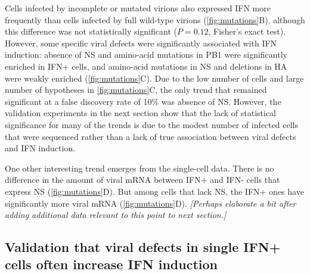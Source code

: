 \documentclass[10pt,letterpaper]{article}
\newcommand{\FIG}[1]{\autoref{fig:#1}}
\newcommand{\jdbcomment}[1]{\emph{\color{red} [#1]}}
\begin{document}
Cells infected by incomplete or mutated virions also expressed IFN more frequently than cells infected by full wild-type virions (\FIG{mutations}B), although this difference was not statistically significant ($P = 0.12$, Fisher's exact test).
However, some specific viral defects were significantly associated with IFN induction: absence of NS and amino-acid mutations in PB1 were significantly enriched in IFN+ cells, and amino-acid mutations in NS and deletions in HA were weakly enriched (\FIG{mutations}C).
Due to the low number of cells and large number of hypotheses in \FIG{mutations}C, the only trend that remained significant at a false discovery rate of 10\% was absence of NS.
However, the validation experiments in the next section show that the lack of statistical significance for many of the trends is due to the modest number of infected cells that were sequenced rather than a lack of true association between viral defects and IFN induction.

One other interesting trend emerges from the single-cell data.
There is no difference in the amount of viral mRNA between IFN+ and IFN- cells that express NS (\FIG{mutations}D).
But among cells that lack NS, the IFN+ ones have significantly more viral mRNA (\FIG{mutations}D).
\jdbcomment{Perhaps elaborate a bit after adding additional data relevant to this point to next section.}

\subsection*{Validation that viral defects in single IFN+ cells often increase IFN induction}
\end{document}
